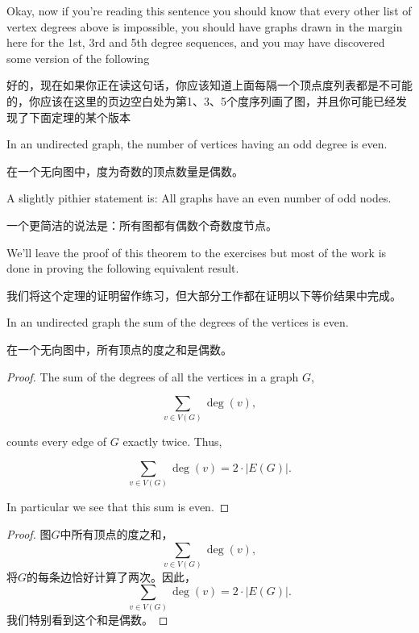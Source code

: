 Okay, now if you're reading this sentence you should know that every 
other list of vertex degrees above is impossible, you should have graphs
drawn in the margin here for the 1st, 3rd and 5th degree sequences, and
you may have discovered some version of the following

好的，现在如果你正在读这句话，你应该知道上面每隔一个顶点度列表都是不可能的，你应该在这里的页边空白处为第1、3、5个度序列画了图，并且你可能已经发现了下面定理的某个版本

\begin{thm} 
In an undirected graph, the number of vertices having an odd degree is even.
\end{thm}

\begin{thm}
在一个无向图中，度为奇数的顶点数量是偶数。
\end{thm}

A slightly pithier statement is: All graphs have an even number of 
odd nodes.

一个更简洁的说法是：所有图都有偶数个奇数度节点。

We'll leave the proof of this theorem to the exercises but most of the
work is done in proving the following equivalent result.

我们将这个定理的证明留作练习，但大部分工作都在证明以下等价结果中完成。

\begin{thm}
In an undirected graph the sum of the degrees of the vertices is even.
\end{thm}

\begin{thm}
在一个无向图中，所有顶点的度之和是偶数。
\end{thm}

\begin{proof}
The sum of the degrees of all the vertices in a graph $G$,

\[ \sum_{v\in V(G)} \deg(v), \]

\noindent counts every edge of $G$ exactly twice.
Thus,

 \[ \sum_{v\in V(G)} \deg(v) = 2 \cdot |E(G)|. \]

In particular we see that this sum is even.
\end{proof}

\begin{proof}
图$G$中所有顶点的度之和，
\[ \sum_{v\in V(G)} \deg(v), \]
\noindent 将$G$的每条边恰好计算了两次。因此，
 \[ \sum_{v\in V(G)} \deg(v) = 2 \cdot |E(G)|. \]
我们特别看到这个和是偶数。
\end{proof}

